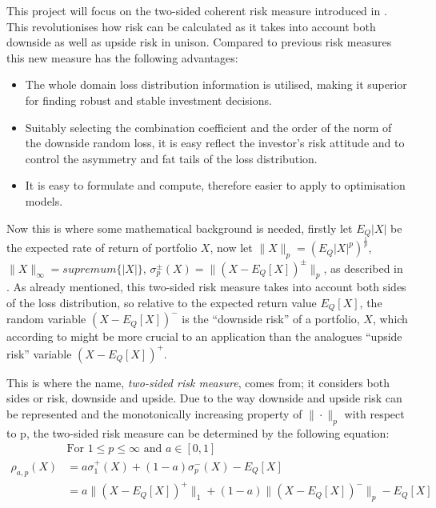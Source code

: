   This project will focus on the two-sided coherent risk measure introduced in \cite{two_sided_risk}. This revolutionises how risk can be calculated as it takes into account both downside as well as upside risk in unison. Compared to previous risk measures this new measure has the following advantages:
  \begin{itemize}
    \item The whole domain loss distribution information is utilised, making it superior for finding robust and stable investment decisions.
    \item Suitably selecting the combination coefficient and the order of the norm of the downside random loss, it is easy reflect the investor's risk attitude and to control the asymmetry and fat tails of the loss distribution.
    \item It is easy to formulate and compute, therefore easier to apply to optimisation models.
  \end{itemize}

  Now this is where some mathematical background is needed, firstly let $E_Q |X|$ be the expected rate of return of portfolio $X$, now let $\| X \|_p = (E_Q |X|^p)^{\frac{1}{p}}$, $\|X\|_\infty = supremum \{ |X|\}$, $\sigma_p^{\pm} (X) = \|(X-E_Q[X])^{\pm}\|_p$, as described in \cite{two_sided_risk}. As already mentioned, this two-sided risk measure takes into account both sides of the loss distribution, so relative to the expected return value $E_Q[X]$, the random variable $(X-E_Q[X])^-$ is the ``downside risk'' of a portfolio, $X$, which according to \cite{two_sided_risk} might be more crucial to an application than the analogues ``upside risk'' variable $(X-E_Q[X])^+$.

  This is where the name, \textit{two-sided risk measure}, comes from; it considers both sides or risk, downside and upside. Due to the way downside and upside risk can be represented and the monotonically increasing property of $\| \cdot \|_p$ with respect to p, the two-sided risk measure can be determined by the following equation:
  \begin{equation} \label{eq:two-sided}
    \begin{split}
      & \text{For } 1 \leq p \leq \infty \text{ and } a \in [0,1] \\
      \rho_{a,p}(X) & = a \sigma_1^+(X) + (1-a)\sigma_p^-(X) - E_Q[X ]\\
      & = a \|(X-E_Q[X])^+\|_1 + (1-a) \|(X-E_Q[X])^-\|_p - E_Q[X] \\
    \end{split}
  \end{equation}

